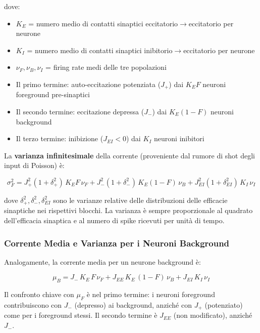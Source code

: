 dove:
\begin{itemize}
    \item $K_E$ = numero medio di contatti sinaptici eccitatorio$\rightarrow$eccitatorio per neurone
    \item $K_I$ = numero medio di contatti sinaptici inibitorio$\rightarrow$eccitatorio per neurone
    \item $\nu_F, \nu_B, \nu_I$ = firing rate medi delle tre popolazioni
    \item Il primo termine: auto-eccitazione potenziata ($J_+$) dai $K_E F$ neuroni foreground pre-sinaptici
    \item Il secondo termine: eccitazione depressa ($J_-$) dai $K_E(1-F)$ neuroni background
    \item Il terzo termine: inibizione ($J_{EI} < 0$) dai $K_I$ neuroni inibitori
\end{itemize}

La \textbf{varianza infinitesimale} della corrente (proveniente dal rumore di shot degli input di Poisson) è:

\begin{equation}
\sigma_F^2 = J_+^2 (1+\delta_+^2)\, K_E F\, \nu_F + J_-^2 (1+\delta_-^2)\, K_E (1-F)\, \nu_B + J_{EI}^2 (1+\delta_{EI}^2)\, K_I\, \nu_I
\end{equation}

dove $\delta_+^2, \delta_-^2, \delta_{EI}^2$ sono le varianze relative delle distribuzioni delle efficacie sinaptiche nei rispettivi blocchi. La varianza è sempre proporzionale al quadrato dell'efficacia sinaptica e al numero di spike ricevuti per unità di tempo.

\subsubsection{Corrente Media e Varianza per i Neuroni Background}

Analogamente, la corrente media per un neurone background è:

\begin{equation}
\mu_B = J_- \, K_E \, F \, \nu_F + J_{EE} \, K_E \, (1-F) \, \nu_B + J_{EI} \, K_I \, \nu_I
\end{equation}

Il confronto chiave con $\mu_F$ è nel primo termine: i neuroni foreground contribuiscono con $J_-$ (depresso) ai background, anziché con $J_+$ (potenziato) come per i foreground stessi. Il secondo termine è $J_{EE}$ (non modificato), anziché $J_-$.

